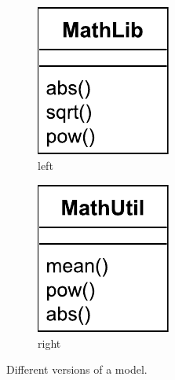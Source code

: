 \documentclass{jot}
\begin{document}
\begin{minipage}[t]{0.61\linewidth}
\begin{figure}[H]
\begin{subfigure}[t]{0.2\linewidth}
\includegraphics[width=\linewidth]{LeftClassDiagram}
\caption{left}
\label{fig:left}
\end{subfigure}
\hfill
\begin{subfigure}[t]{0.2\linewidth}
\centering
\includegraphics[width=\linewidth]{RightClassDiagram}
\caption{right}
\label{fig:right}
\end{subfigure}
\hfill
\label{fig:versions}
\caption{Different versions of a model.}
\end{figure}
\end{minipage}
\end{document}
